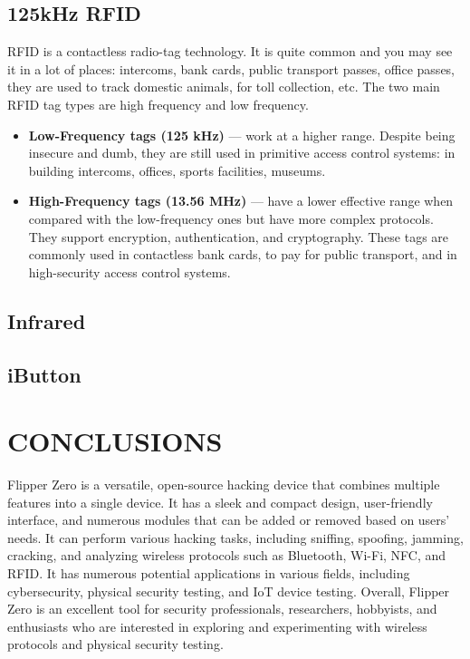 \documentclass[a4paper,11pt]{report}
\begin{document}
\section{125kHz RFID}
RFID is a contactless radio-tag technology. It is quite common and you may see it in a lot of places: intercoms, bank cards, public transport passes, office passes, they are used to track domestic animals, for toll collection, etc. The two main RFID tag types are high frequency and low frequency.
\begin{itemize}
  \item \textbf{Low-Frequency tags (125 kHz)} — work at a higher range. Despite being insecure and dumb, they are still used in primitive access control systems: in building intercoms, offices, sports facilities, museums.
  \item \textbf{High-Frequency tags (13.56 MHz)} — have a lower effective range when compared with the low-frequency ones but have more complex protocols. They support encryption, authentication, and cryptography. These tags are commonly used in contactless bank cards, to pay for public transport, and in high-security access control systems.
  \end{itemize}
\section{Infrared}
\section{iButton}
\chapter{CONCLUSIONS}
Flipper Zero is a versatile, open-source hacking device that combines multiple features into a single device. It has a sleek and compact design, user-friendly interface, and numerous modules that can be added or removed based on users' needs. It can perform various hacking tasks, including sniffing, spoofing, jamming, cracking, and analyzing wireless protocols such as Bluetooth, Wi-Fi, NFC, and RFID. It has numerous potential applications in various fields, including cybersecurity, physical security testing, and IoT device testing. Overall, Flipper Zero is an excellent tool for security professionals, researchers, hobbyists, and enthusiasts who are interested in exploring and experimenting with wireless protocols and physical security testing.
\end{document}
